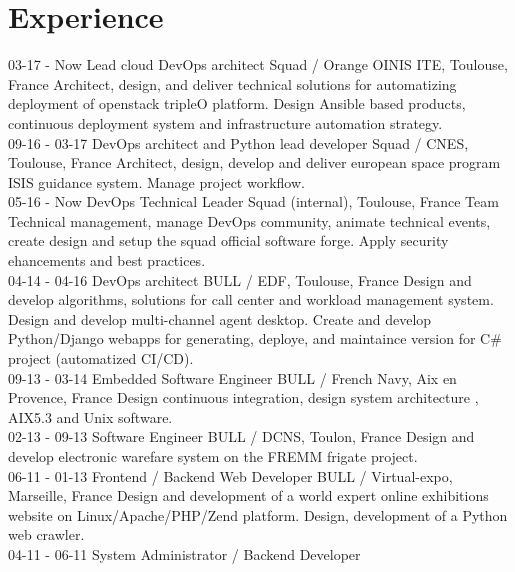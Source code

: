 \documentclass[]{friggeri-cv}
\begin{document}
\newpage
\section{Experience}
\begin{entrylist}
    \entry
        {03-17 - Now}
        {Lead cloud DevOps architect}
        {Squad / Orange OINIS ITE, Toulouse, France}
        {Architect, design, and deliver technical solutions for automatizing deployment of openstack tripleO platform.
        Design Ansible based products, continuous deployment system and infrastructure automation strategy.\\}
    \entry
        {09-16 - 03-17}
        {DevOps architect and Python lead developer}
        {Squad / CNES, Toulouse, France}
        {Architect, design, develop and deliver european space program ISIS guidance system. Manage project workflow.\\}
    \entry
        {05-16 - Now}
        {DevOps Technical Leader}
        {Squad (internal), Toulouse, France}
        {Team Technical management, manage DevOps community, animate technical events, 
        create design and setup the squad official software forge. Apply security ehancements and best practices.\\}
    \entry
        {04-14 - 04-16}
        {DevOps architect}
        {BULL / EDF, Toulouse, France}
        {Design and develop algorithms, solutions for call center and workload management system. Design and develop multi-channel agent desktop.
        Create and develop Python/Django webapps for generating, deploye, and maintaince version for C\# project (automatized CI/CD).\\}
    \entry
        {09-13 - 03-14}
        {Embedded Software Engineer}
        {BULL / French Navy, Aix en Provence, France}
        {Design continuous integration, design system architecture , AIX5.3 and Unix software.\\}
    \entry
        {02-13 - 09-13}
        {Software Engineer}
        {BULL / DCNS, Toulon, France}
        {Design and develop electronic warefare system on the FREMM frigate project.\\}
    \entry
        {06-11 - 01-13}
        {Frontend / Backend Web Developer}
        {BULL / Virtual-expo, Marseille, France}
        {Design and development of a world expert online exhibitions website on Linux/Apache/PHP/Zend platform. Design, development of a Python web crawler.\\}
    \entry
        {04-11 - 06-11}
        {System Administrator / Backend Developer}

\end{entrylist}
\end{document}
